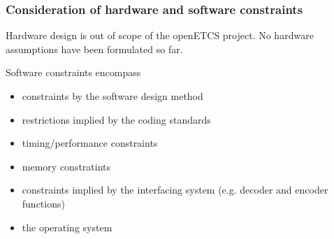 \subsubsection{Consideration of hardware and software constraints}



Hardware design is out of scope of the openETCS project. 
No hardware assumptions have been formulated so far.

\noindent 
Software constraints encompass 

\begin{itemize}
   \item constraints by the software design method
   \item restrictions implied by the coding standards
   \item timing\slash performance constraints
   \item memory constratints 
   \item constraints implied by 
         the interfacing system (e.g. decoder and encoder functions)
   \item the operating system
\end{itemize}


